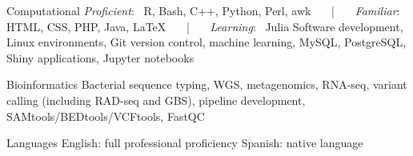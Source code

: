 
\begin{cvskills}

\cvskill
{Computational} %
{
    \textit{Proficient}:~ R, Bash, C++, Python, Perl, awk ~~~|~~~ \textit{Familiar}:~ HTML, CSS, PHP, Java, LaTeX  ~~~|~~~ \textit{Learning}:~ Julia\linebreak
    Software development, Linux environments, Git version control, machine learning, MySQL, PostgreSQL,\linebreak
    Shiny applications, Jupyter notebooks
} %

\cvskill
{Bioinformatics} %
{
    Bacterial sequence typing, WGS, metagenomics, RNA-seq, variant calling (including RAD-seq and GBS),\linebreak
    pipeline development, SAMtools/BEDtools/VCFtools, FastQC
} %

\cvskill
{Languages} %
{
English: full professional proficiency\linebreak
Spanish: native language
} %


\end{cvskills}